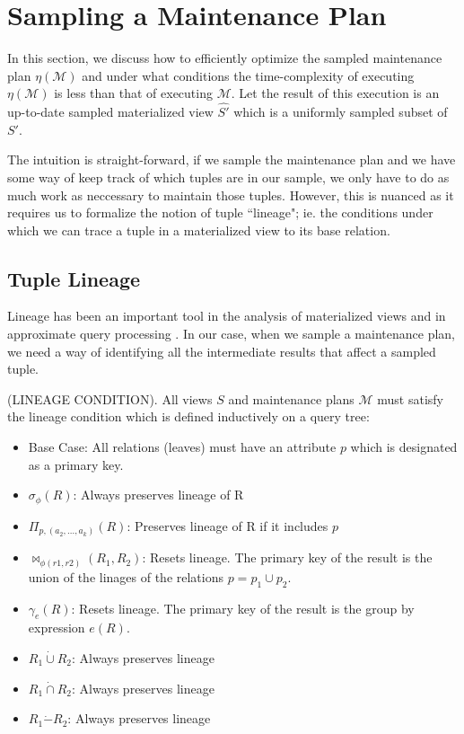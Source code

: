 \section{Sampling a Maintenance Plan}
\label{sampling}
In this section, we discuss how to efficiently optimize the sampled maintenance plan $\eta(\mathcal{M})$ and under what conditions the time-complexity of executing $\eta(\mathcal{M})$ is less than that of executing $\mathcal{M}$.
Let the result of this execution is an up-to-date sampled materialized view $\hat{S'}$ which is a uniformly sampled subset of $S'$.

The intuition is straight-forward, if we sample the maintenance plan and we have some way of keep track of which tuples are in our sample, we only have to do as much work as neccessary to maintain those tuples. 
However, this is nuanced as it requires us to formalize the notion of tuple ``lineage"; ie. the conditions under which we can trace a tuple in a materialized view to its base relation.

\subsection{Tuple Lineage}
Lineage has been an important tool in the analysis of materialized views \cite{DBLP:journals/vldb/CuiW03} and in approximate query processing \cite{DBLP:conf/sigmod/ZengGMZ14}.
In our case, when we sample a maintenance plan, we need a way of identifying all the intermediate results that affect a sampled tuple.

\begin{definition}
(LINEAGE CONDITION). All views $S$ and maintenance plans $\mathcal{M}$ must satisfy the lineage condition which is defined inductively on a query tree:
\begin{itemize}\vspace{-.45em}
\item Base Case: All relations (leaves) must have an attribute $p$ which is designated as a primary key.\vspace{-.45em}
\item $\sigma_{\phi}(R)$: Always preserves lineage of R \vspace{-.45em}
\item $\Pi_{p,(a_2,...,a_k)}(R)$: Preserves lineage of R if it includes $p$ \vspace{-.45em}
\item $\bowtie_{\phi (r1,r2)}(R_1,R_2)$: Resets lineage. The primary key of the result is the union of the linages of the relations $p= p_1 \cup p_2$.
\item $\gamma_{e}(R)$: Resets lineage. The primary key of the result is the group by expression $e(R)$.\vspace{-.45em}
\item $R_1 \dot{\cup} R_2$: Always preserves lineage
\item $R_1 \dot{\cap} R_2$: Always preserves lineage 
\item $R_1 \dot{-} R_2$: Always preserves lineage 
\end{itemize}
\end{definition}


